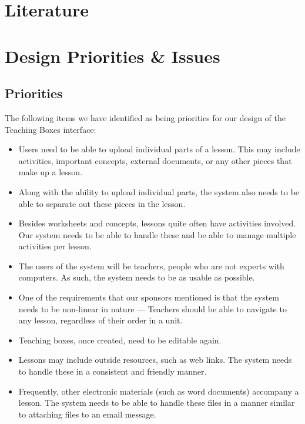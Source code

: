 \documentclass[12pt,titlepage]{article}
\begin{document}
\section{Literature}


\section{Design Priorities \& Issues}
\subsection{Priorities}

The following items we have identified as being priorities for our design of
the Teaching Boxes interface:

\begin{itemize}
\item Users need to be able to upload individual parts of a lesson.  This may
      include activities, important concepts, external documents, or any other
      pieces that make up a lesson.

\item Along with the ability to upload individual parts, the system also needs
      to be able to separate out these pieces in the lesson.

\item Besides worksheets and concepts, lessons quite often have activities
      involved.  Our system needs to be able to handle these and be able
      to manage multiple activities per lesson.

\item The users of the system will be teachers, people who are not experts
      with computers.  As such, the system needs to be as usable as possible.

\item One of the requirements that our sponsors mentioned is that the system
      needs to be non-linear in nature --- Teachers should be able to navigate
      to any lesson, regardless of their order in a unit.

\item Teaching boxes, once created, need to be editable again.

\item Lessons may include outside resources, such as web links.  The system
      needs to handle these in a consistent and friendly manner.

\item Frequently, other electronic materials (such as word documents) accompany
      a lesson.  The system needs to be able to handle these files in a manner
      similar to attaching files to an email message.


\end{itemize}
\end{document}

